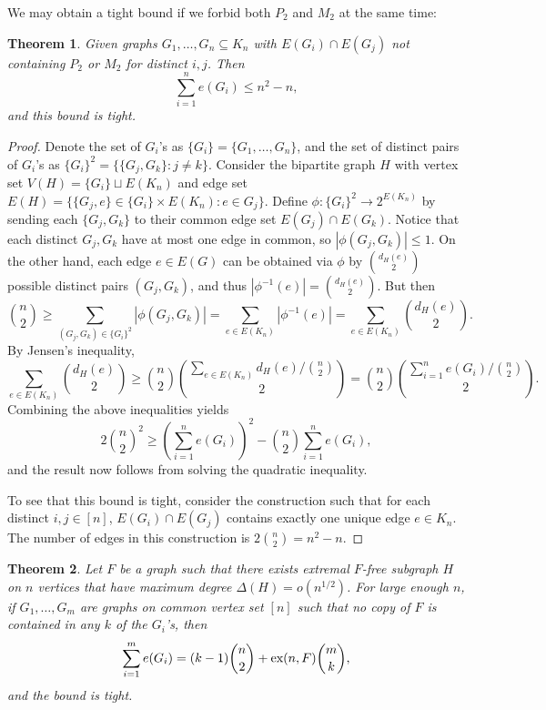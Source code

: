 \documentclass[12pt]{report}
\newtheorem{theorem}{Theorem}[chapter]
\begin{document}
We may obtain a tight bound if we forbid both $P_2$ and $M_2$ at the same time:

\begin{theorem}
  Given graphs $G_1, \ldots, G_n \subseteq K_n$ with $E(G_i) \cap E(G_j)$ not containing $P_2$ or
  $M_2$ for distinct $i, j$. Then
  \[
    \sum_{i = 1}^n e(G_i) \leq n^2 - n,
  \]
  and this bound is tight.
\end{theorem}

\begin{proof}
  Denote the set of $G_i$'s as $\{G_i\} = \{G_1, \ldots, G_n\}$, and the set of distinct pairs of
  $G_i$'s as $\{G_i\}^2 = \{\{G_j, G_k\} : j \neq k\}$. Consider the bipartite graph $H$ with
  vertex set $V(H) = \{G_i\} \sqcup E(K_n)$ and edge set $E(H) = \{\{G_j, e\} \in \{G_i\} \times
  E(K_n) : e \in G_j\}$. Define $\phi: \{G_i\}^2 \to 2^{E(K_n)}$ by sending each $\{G_j, G_k\}$ to
  their common edge set $E(G_j) \cap E(G_k)$. Notice that each distinct $G_j, G_k$ have at most
  one edge in common, so $|\phi(G_j, G_k)| \leq 1$. On the other hand, each edge $e \in E(G)$ can
  be obtained via $\phi$ by $\binom{d_H(e)}{2}$ possible distinct pairs $(G_j, G_k)$, and thus
  $|\phi^{-1}(e)| = \binom{d_H(e)}{2}$. But then
  \[
    \binom{n}{2} \geq \sum_{(G_j, G_k) \in \{G_i\}^2} |\phi(G_j, G_k)| = \sum_{e \in E(K_n)} |\phi^{-1}(e)| = \sum_{e \in E(K_n)} \binom{d_H(e)}{2}.
  \]
  By Jensen's inequality,
  \[
    \sum_{e \in E(K_n)} \binom{d_H(e)}{2} \geq \binom{n}{2}\binom{\sum_{e \in E(K_n)} d_H(e)/\binom{n}{2}}{2} = \binom{n}{2}\binom{\sum_{i = 1}^n e(G_i)/\binom{n}{2}}{2}.
  \]
  Combining the above inequalities yields
  \[
    2\binom{n}{2}^2 \geq \left(\sum_{i = 1}^n e(G_i)\right)^2 - \binom{n}{2}\sum_{i = 1}^n e(G_i),
  \]
  and the result now follows from solving the quadratic inequality.

  To see that this bound is tight, consider the construction such that for each distinct $i, j \in
  [n]$, $E(G_i) \cap E(G_j)$ contains exactly one unique edge $e \in K_n$. The number of edges in
  this construction is $2\binom{n}{2} = n^2 - n$.
\end{proof}

\begin{theorem}
  Let $F$ be a graph such that there exists extremal $F$-free subgraph $H$ on $n$ vertices that have
  maximum degree $\Delta(H) = o(n^{1/2})$. For large enough $n$, if $G_1, \ldots, G_m$ are graphs on
  common vertex set $[n]$ such that no copy of $F$ is contained in any $k$ of the $G_i$'s, then
  \[
    \sum_{i = 1}^m e(G_i) = (k - 1)\binom{n}{2} + \textnormal{ex}(n, F)\binom{m}{k},
  \]
  and the bound is tight.
\end{theorem}
\end{document}
